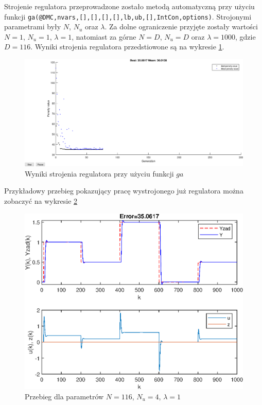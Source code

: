 Strojenie regulatora przeprowadzone zostało metodą automatyczną przy użyciu\\ funkcji \verb+ga(@DMC,nvars,[],[],[],[],lb,ub,[],IntCon,options)+. Strojonymi parametrami były $N$, $N_u$ oraz $\lambda$. Za dolne ograniczenie przyjęte zostały wartości $N=1$, $N_u = 1$, $\lambda = 1$, natomiast za górne $N=D$, $N_u = D$ oraz $\lambda = 1000$, gdzie $D = 116$. Wyniki strojenia regulatora przedstiowone są na wykresie \ref{fig:strojenie}.

\begin{figure}[h!]
	\centering
	\includegraphics[scale=0.5]{Rys/strojenie.eps}
	\caption{Wyniki strojenia regulatora przy użyciu funkcji $ga$}
	\label{fig:strojenie}
\end{figure}

Przykładowy przebieg pokazujący pracę wystrojonego już regulatora można zobaczyć na wykresie \ref{fig:przebieg1}

\begin{figure}
	\centering
	\includegraphics[scale=1]{Rys/przebieg1.eps}
	\caption{Przebieg dla parametrów $N = 116$, $N_u = 4$, $\lambda = 1$}
	\label{fig:przebieg1}
\end{figure}
